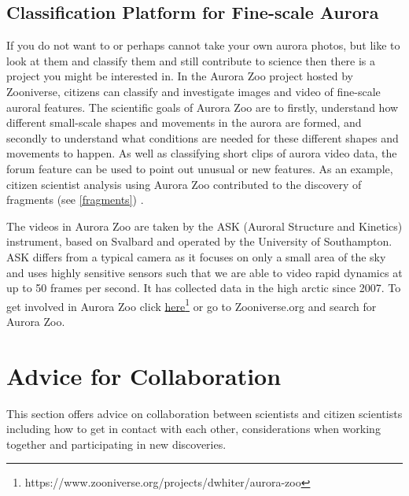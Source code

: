 \documentclass{article}
\renewcommand{\cite}[1]{\parencite{#1}}
\newcommand{\contributed}[1]{%
    \par\noindent
    \begingroup
    \setlength{\leftskip}{1em}%
    \itshape
    Contributors: #1
    \par
    \endgroup
    \vspace{0.5em}
}
\begin{document}
\begin{enumerate}
\end{enumerate}



\subsection{Classification Platform for Fine-scale Aurora  }\label{classification}
If you do not want to or perhaps cannot take your own aurora photos, but like to look at them and classify them and still contribute to science then there is a project you might be interested in. In the Aurora Zoo project hosted by Zooniverse, citizens can classify and investigate images and video of fine-scale auroral features. The scientific goals of Aurora Zoo are to firstly, understand how different small-scale shapes and movements in the aurora are formed, and secondly to understand what conditions are needed for these different shapes and movements to happen. As well as classifying short clips of aurora video data, the forum feature can be used to point out unusual or new features. As an example, citizen scientist analysis using Aurora Zoo contributed to the discovery of fragments (see \ref{fragments}) \cite{Whiter2021}.

The videos in Aurora Zoo are taken by the ASK (Auroral Structure and Kinetics) instrument, based on Svalbard and operated by the University of Southampton. ASK differs from a typical camera as it focuses on only a small area of the sky and uses highly sensitive sensors such that we are able to video rapid dynamics at up to 50 frames per second. It has collected data in the high arctic since 2007.
To get involved in Aurora Zoo click \href{https://www.zooniverse.org/projects/dwhiter/aurora-zoo}{here}\footnote{https://www.zooniverse.org/projects/dwhiter/aurora-zoo} or go to Zooniverse.org and search for Aurora Zoo.


\section{Advice for Collaboration}
This section offers advice on collaboration between scientists and citizen scientists including how to get in contact with each other, considerations when working together and participating in new discoveries. 
\end{document}
